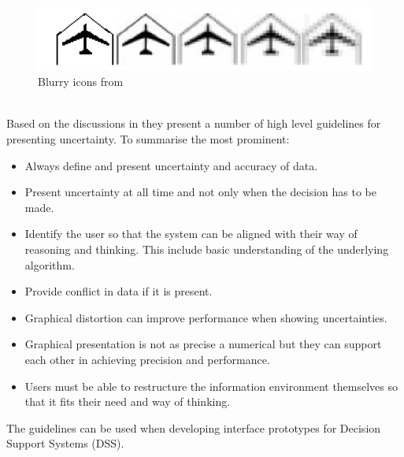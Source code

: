 \begin{figure}[h!]
\centering
\includegraphics[width=0.7\linewidth,natwidth=898,natheight=587]{billeder/blurryIcons.png}
\caption{Blurry icons from \cite{UncertainInformation}}
\label{fig:blurryIcons}
\end{figure}  
\\[0.5cm]
Based on the discussions in \cite{UncertainInformation} they present a number of high level guidelines for presenting uncertainty. To summarise the most prominent:
\begin{itemize}
\item Always define and present uncertainty and accuracy of data.
\item Present uncertainty at all time and not only when the decision has to be made.
\item Identify the user so that the system can be aligned with their way of reasoning and thinking. This include basic understanding of the underlying algorithm.
\item Provide conflict in data if it is present.
\item Graphical distortion can improve performance when showing uncertainties.
\item Graphical presentation is not as precise a numerical but they can support each other in achieving precision and performance.
\item Users must be able to restructure the information environment themselves so that it fits their need and way of thinking.
\end{itemize}
The guidelines can be used when developing interface prototypes for Decision Support Systems (DSS).